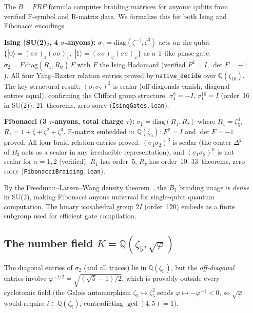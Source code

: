 \documentclass[12pt]{article}
\newcommand{\lean}[1]{\texttt{#1}}
\newcommand{\nativedecide}{\texttt{native\_decide}}
\begin{document}
The $B = FRF$ formula computes braiding matrices for anyonic qubits
from verified F-symbol and R-matrix data.  We formalize this for both
Ising and Fibonacci encodings.

\textbf{Ising (SU(2)$_2$, 4 $\sigma$-anyons):}
$\sigma_1 = \mathrm{diag}(\zeta^{-1}, \zeta^3)$ acts on the
qubit $\{|0\rangle = (\sigma\sigma)_1(\sigma\sigma)_1,\;
|1\rangle = (\sigma\sigma)_\psi(\sigma\sigma)_\psi\}$ as a T-like
phase gate.  $\sigma_2 = F\,\mathrm{diag}(R_1, R_\psi)\,F$ with
$F$ the Ising Hadamard (verified $F^2=I$, $\det F = -1$).  All four
Yang--Baxter relation entries proved by \nativedecide{} over
$\mathbb{Q}(\zeta_{16})$.  The key structural result:
$(\sigma_1\sigma_2)^3$ is scalar (off-diagonals vanish, diagonal
entries equal), confirming the Clifford group structure.
$\sigma_1^8 = -I$, $\sigma_1^{16} = I$ (order~16 in SU(2)).
21~theorems, zero sorry (\lean{IsingGates.lean}).

\textbf{Fibonacci (3 $\tau$-anyons, total charge $\tau$):}
$\sigma_1 = \mathrm{diag}(R_1, R_\tau)$ where
$R_1 = \zeta_5^3$, $R_\tau = 1{+}\zeta{+}\zeta^2{+}\zeta^3$.
F-matrix embedded in $\mathbb{Q}(\zeta_5)$: $F^2=I$ and $\det F=-1$
proved.  All four braid relation entries proved.
$(\sigma_1\sigma_2)^3$ is scalar (the center $\Delta^2$ of $B_3$
acts as a scalar in any irreducible representation), and
$(\sigma_1\sigma_2)^n$ is not scalar for $n=1,2$ (verified).
$R_1$ has order~5, $R_\tau$ has order~10.
33~theorems, zero sorry (\lean{FibonacciBraiding.lean}).

By the Freedman--Larsen--Wang density theorem~\cite{flw2002},
the $B_3$ braiding image is \emph{dense} in SU(2), making Fibonacci
anyons universal for single-qubit quantum computation.  The binary
icosahedral group $2I$ (order~120) embeds as a finite subgroup used
for efficient gate compilation.

\subsection{The number field $K = \mathbb{Q}(\zeta_5, \sqrt{\varphi})$}

The diagonal entries of $\sigma_2$ (and all traces) lie in
$\mathbb{Q}(\zeta_5)$, but the \emph{off-diagonal} entries involve
$\varphi^{-1/2} = \sqrt{({\sqrt{5}-1})/{2}}$, which is provably
outside every cyclotomic field (the Galois automorphism
$\zeta_5 \mapsto \zeta_5^2$ sends $\varphi \mapsto -\varphi^{-1} < 0$,
so $\sqrt{\varphi}$ would require $i \in \mathbb{Q}(\zeta_5)$,
contradicting $\gcd(4,5) = 1$).
\end{document}

